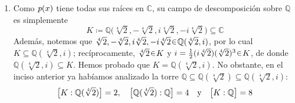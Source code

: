 \begin{sol}
\begin{enumerate}[label=\alph*)]
\item 
Como $\operatorname{\textit{p}}(x)$ tiene todas sus raíces en $\mathbb{C}$, su campo de descomposición sobre $\mathbb{Q}$ es simplemente 
\[
K \coloneq \mathbb{Q}\big(\sqrt[4]{2},-\sqrt[4]{2},i\sqrt[4]{2},-i\sqrt[4]{2}\big) \subseteq \mathbb{C}
\]
Además, notemos que $\sqrt[4]{2},-\sqrt[4]{2},i\sqrt[4]{2},-i\sqrt[4]{2} \en \mathbb{Q}(\sqrt[4]{2},i)$, por lo cual $K \subseteq \mathbb{Q}(\sqrt[4]{2},i)$; recíprocamente, $\sqrt[4]{2} \en K$ y $i = \frac12(i\sqrt[4]{2})(\sqrt[4]{2})^3 \en K$, de donde $\mathbb{Q}(\sqrt[4]{2},i) \subseteq K$. Hemos probado que $K = \mathbb{Q}(\sqrt[4]{2},i)$. No obstante, en el inciso anterior ya habíamos analizado la torre $\mathbb{Q} \subseteq \mathbb{Q}(\sqrt[4]{2}) \subseteq \mathbb{Q}(\sqrt[4]{2},i)$:
\[
\brack[\big]{K : \mathbb{Q}(\sqrt[4]{2})} = 2,%
\quad%
\brack[\big]{\mathbb{Q}(\sqrt[4]{2}) : \mathbb{Q}} = 4%
\quad\text{y}\quad%
\brack[\big]{K : \mathbb{Q}} = 8
\]


\end{enumerate}
\end{sol}
